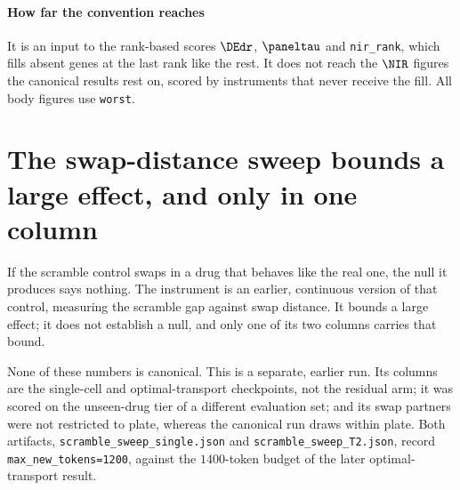 \paragraph{How far the convention reaches} It is an input to the rank-based
scores $\DEdr$, $\paneltau$ and \texttt{nir\_rank}, which fills absent genes at
the last rank like the rest. It does not reach the $\NIR$
figures the canonical results rest on, scored by instruments that never receive
the fill. All body figures use \texttt{worst}.

\section{The swap-distance sweep bounds a large effect, and only in one column}
\label{sec:app-sweep}

\begin{question}
If the scramble control swaps in a drug that behaves like the real one, the null
it produces says nothing. The instrument is an earlier, continuous version of
that control, measuring the scramble gap against swap distance. It bounds a
large effect; it does not establish a null, and only one of its two columns
carries that bound.
\end{question}

\noindent
None of these numbers is canonical. This is a
separate, earlier run. Its columns are the single-cell and
optimal-transport checkpoints, not the residual arm; it was scored on the
unseen-drug tier of a different evaluation set; and its swap partners were not
restricted to plate, whereas the canonical run draws within plate. Both
artifacts, \texttt{scramble\_sweep\_single.json} and
\texttt{scramble\_sweep\_T2.json}, record \texttt{max\_new\_tokens=1200},
against the $1400$-token budget of the later optimal-transport result.

